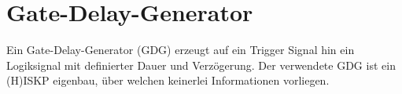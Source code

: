 \section{Gate-Delay-Generator}

Ein Gate-Delay-Generator (GDG) erzeugt auf ein Trigger Signal hin ein Logiksignal mit definierter Dauer und Verzögerung\cite[297]{leotechniques}.
Der verwendete GDG ist ein (H)ISKP eigenbau, über welchen keinerlei Informationen vorliegen.
